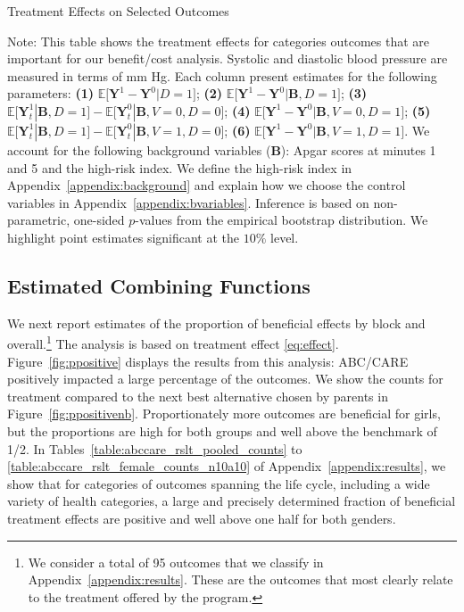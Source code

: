 \begin{table}[!htbp]
\centering
\begin{threeparttable}
\caption{Treatment Effects on Selected Outcomes}\label{table:tescombined}
\begin{scriptsize}

\end{scriptsize}
\begin{tablenotes}
\tiny
Note: This table shows the treatment effects for categories outcomes that are important for our benefit/cost analysis. Systolic and diastolic blood pressure are measured in terms of mm Hg. Each column present estimates for the following parameters: \textbf{(1)} $\mathbb{E} \big[ \bm{Y}^1 - \bm{Y}^0 | D = 1]$; {\textbf{(2)} $\mathbb{E} \big[ \bm{Y}^1 - \bm{Y}^0 | \bm{B}, D=1 \big]$}; {\textbf{(3)} $\mathbb{E} \big[ \bm{Y}^1_t | \bm{B}, D=1 \big] - \mathbb{E} \big[ \bm{Y}^0_t | \bm{B}, V=0, D=0 \big]$}; {\textbf{(4)} $\mathbb{E} \big[ \bm{Y}^1 - \bm{Y}^0 | \bm{B}, V=0, D = 1 \big] $}; {\textbf{(5)} $\mathbb{E} \big[ \bm{Y}^1_t | \bm{B}, D=1 \big] - \mathbb{E} \big[ \bm{Y}^0_t | \bm{B}, V=1, D = 0 \big]$}; {\textbf{(6)} $\mathbb{E} \big[ \bm{Y}^1 - \bm{Y}^0 | \bm{B}, V=1 , D = 1\big]$}. We account for the following background variables ($\bm{B}$): Apgar scores at minutes 1 and 5 and the high-risk index. We define the high-risk index in Appendix~\ref{appendix:background} and explain how we choose the control variables in Appendix~\ref{appendix:bvariables}. Inference is based on non-parametric, one-sided $p$-values from the empirical bootstrap distribution. We highlight point estimates significant at the $10\%$ level.
\end{tablenotes}
\end{threeparttable}
\end{table}
\restoregeometry
\doublespacing

\subsection{Estimated Combining Functions}

We next report estimates of the proportion of beneficial effects by block and overall.\footnote{We consider a total of 95 outcomes that we classify in Appendix~\ref{appendix:results}. These are the outcomes that most clearly relate to the treatment offered by the program.} The analysis is based on treatment effect \eqref{eq:effect}. Figure~\ref{fig:ppositive} displays the results from this analysis: ABC/CARE positively impacted a large percentage of the outcomes. We show the counts for treatment compared to the next best alternative chosen by parents in Figure~\ref{fig:ppositivenb}. Proportionately more outcomes are beneficial for girls, but the proportions are high for both groups and well above the benchmark of 1/2. In Tables~\ref{table:abccare_rslt_pooled_counts} to \ref{table:abccare_rslt_female_counts_n10a10} of Appendix~\ref{appendix:results}, we show that for categories of outcomes spanning the life cycle, including a wide variety of health categories, a large and precisely determined fraction of beneficial treatment effects are positive and well above one half for both genders.

